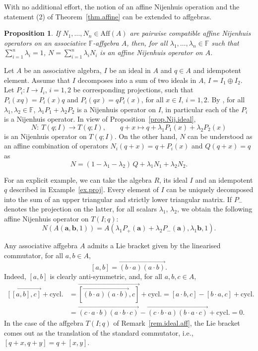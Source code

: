 \documentclass[pdftex]{sigma}
\numberwithin{equation}{section}
\newtheorem{Proposition}[Theorem]{Proposition}
 { \theoremstyle{definition}
\newtheorem{Definition}[Theorem]{Definition}
\newtheorem{Note}[Theorem]{Note}
\newtheorem{Example}[Theorem]{Example}
\newtheorem{Remark}[Theorem]{Remark}}
\newcommand{\F}{\mathbb F}
\begin{document}
With no additional effort, the notion of an affine Nijenhuis operation and the statement (2) of Theorem~\ref{thm.affine} can be extended to affgebras.

\begin{Proposition}\label{prop.affine}
 If $N_1,\dots , N_n\in \mathrm{Aff}(A)$ are pairwise compatible affine Nijenhuis operators on an associative $\F$-affgebra $A$, then, for all $\lambda_1,\dots, \lambda_n\in \F$ such that $\sum_{i=1}^n\lambda_i =1$,
 $N = \sum_{i=1}^n \lambda_i N_i $
 is an affine Nijenhuis operator on $A$.
\end{Proposition}

\begin{Example}
 Let $A$ be an associative algebra, $I$ be an ideal in $A$ and $q\in A$ and idempotent element. Assume that $I$ decomposes into a sum of two ideals in $A$, $I=I_1\oplus I_2$. Let $P_i\colon I\to I_i$, $i=1,2$ be corresponding projections, such that $P_i(xq) = P_i(x)q$ and $P_i(qx) = qP_i(x)$, for all $x\in I$, $i=1,2$. By \cite[Theorem~5]{4}, for all $\lambda_1,\lambda_2 \in \F$, $\lambda_1P_1+\lambda_2P_2$ is a Nijenhuis operator on $I$, in particular each of the $P_i$ is a Nijenhuis operator. In view of Proposition~\ref{prop.Nij.ideal},
 \[
 N\colon\ T(q;I) \to T(q;I), \qquad q+x \mapsto q + \lambda_1 P_1(x) + \lambda_2 P_2(x)
 \]
 is an Nijenhuis operator on $T(q;I)$. On the other hand, $N$ can be understood as an affine combination of operators $N_i(q+x) = q +P_i(x)$ and $Q(q+x) = q$ as
 \[N= (1-\lambda_1-\lambda_2)\,Q + \lambda_1 N_1 +\lambda_2 N_2.
 \]

 For an explicit example, we can take the algebra $R$, its ideal $I$ and an idempotent $q$ described in Example~\ref{ex.proj}. Every element of $I$ can be uniquely decomposed into the sum of an upper triangular and strictly lower triangular matrix. If $P_-$ denotes the projection on the latter, for all scalars $\lambda_1$, $\lambda_2$, we obtain the following affine Nijenhuis operator on $T(I;q)$:
 \[
 N(A(\mathbf{a},\mathbf{b},1)) = A(\lambda_1P_+(\mathbf{a})+\lambda_2P_-(\mathbf{a}),\lambda_1\mathbf{b},1).
 \]
\end{Example}

Any associative affgebra $A$ admits a Lie bracket given by the linearised commutator, for all $a,b\in A$,
\begin{equation}\label{affine.com}
 [a,b] =\overrightarrow{(b\cdot a)(a\cdot b)}.
\end{equation}
Indeed, $[a,b]$ is clearly anti-symmetric, and, for all $a,b,c\in A$,
\begin{align*}
 \overrightarrow{[[a,b],c]} + \mathrm{cycl.} &= \overrightarrow{\left[\overrightarrow{(b\cdot a)(a\cdot b)},c\right]} +\mathrm{cycl.}
 = [a\cdot b,c] - [b\cdot a,c] + \mathrm{cycl.}\\ &= \overrightarrow{(c\cdot a\cdot b)(a\cdot b\cdot c)} - \overrightarrow{(c\cdot b\cdot a)(b\cdot a\cdot c)} + \mathrm{cycl.} =0.
\end{align*}
In the case of the affgebra $T(I;q)$ of Remark~\ref{rem.ideal.aff}, the Lie bracket comes out as the translation of the standard commutator, i.e., $[q+x,q+y]= q+[x,y]$.
\end{document}
